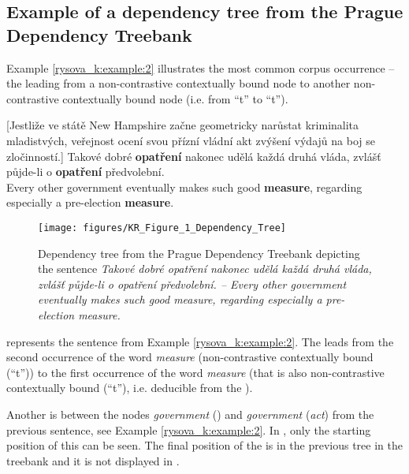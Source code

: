 \documentclass[output=paper]{langsci/langscibook.cls}
\begin{document}
\subsection{Example of a dependency tree from the Prague Dependency Treebank\label{rysova_k:sec:ExampleOfADependencyTree}}

Example \ref{rysova_k:example:2} illustrates the most common corpus occurrence -- the  leading from a non-contrastive contextually bound node to another non-contrastive contextually bound node (i.e. from ``t'' to ``t'').

\ea
\label{rysova_k:example:2}
[Jestliže ve státě New Hampshire začne geometricky narůstat kriminalita mladistvých, veřejnost ocení svou přízní vládní akt zvýšení výdajů na boj se zločinností.] {\cb} 
Takové dobré \textbf{opatření} nakonec udělá každá druhá vláda, zvlášť půjde-li o \textbf{opatření} předvolební. \\
Every other government eventually makes such good \textbf{measure}, regarding especially a pre-election \textbf{measure}.
\z


\begin{figure}[h]
\texttt{[image: figures/KR\_Figure\_1\_Dependency\_Tree]}
\caption{Dependency tree from the Prague Dependency Treebank depicting the sentence \textit{Takové dobré opatření nakonec udělá každá druhá vláda, zvlášť půjde-li o opatření předvolební. -- Every other government eventually makes such good measure, regarding especially a pre-election measure.}}
\label{rysova_k:fig:1}
\end{figure}

 represents the sentence from Example \ref{rysova_k:example:2}. The  leads from the second occurrence of the word \textit{measure} (non-contrastive contextually bound (``t'')) to the first occurrence of the word \textit{measure} (that is also non-contrastive contextually bound (``t''), i.e. deducible from the ). 

Another  is between the nodes\textit{ government} () and \textit{government} (\textit{act}) from the previous sentence, see Example \ref{rysova_k:example:2}. In , only the starting position of this  can be seen. The final position of the  is in the previous tree in the treebank and it is not displayed in .
\end{document}
